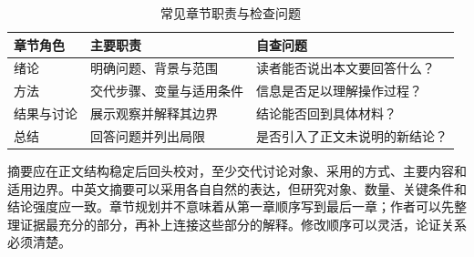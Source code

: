 \begin{table}[htbp]
  \centering
  \small
  \renewcommand{\arraystretch}{1.25}
  \caption{常见章节职责与检查问题}
  \label{tab:guide1}
  \begin{tabular}{@{}>{\raggedright\arraybackslash}p{.2\linewidth}>{\raggedright\arraybackslash}p{.52\linewidth}>{\raggedright\arraybackslash}p{.2\linewidth}@{}}
    \toprule
    章节角色 & 主要职责 & 自查问题 \\
    \midrule
    绪论 & 明确问题、背景与范围 & 读者能否说出本文要回答什么？ \\
    方法 & 交代步骤、变量与适用条件 & 信息是否足以理解操作过程？ \\
    结果与讨论 & 展示观察并解释其边界 & 结论能否回到具体材料？ \\
    总结 & 回答问题并列出局限 & 是否引入了正文未说明的新结论？ \\
    \bottomrule
  \end{tabular}
\end{table}

摘要应在正文结构稳定后回头校对，至少交代讨论对象、采用的方式、主要内容和适用边界。中英文摘要可以采用各自自然的表达，但研究对象、数量、关键条件和结论强度应一致。章节规划并不意味着从第一章顺序写到最后一章；作者可以先整理证据最充分的部分，再补上连接这些部分的解释。修改顺序可以灵活，论证关系必须清楚。
